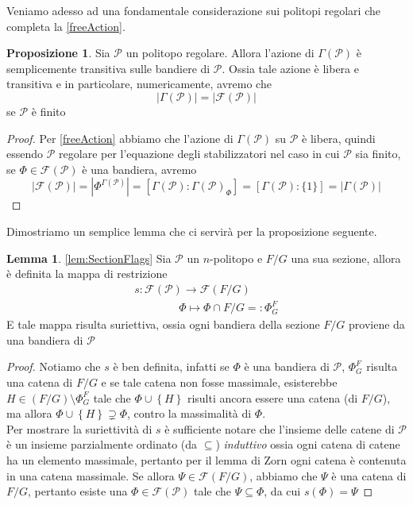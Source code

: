 \documentclass[a4paper,12pt]{report}
\newcommand{\p}{\mathcal{P}}
\theoremstyle{plain}
\theoremstyle{definition}
\newtheorem{lem}[teo]{Lemma}
\newtheorem{prop}[teo]{Proposizione}
\begin{document}
Veniamo adesso ad una fondamentale considerazione sui politopi regolari che completa la \ref{freeAction}.
\begin{prop}
Sia $\p$ un politopo regolare. Allora l'azione di $\Gamma(\p)$ \`e semplicemente transitiva sulle bandiere di $\p$. Ossia tale azione \`e 
libera e transitiva e in particolare, numericamente, avremo che
\begin{equation*}
\left|\Gamma(\p)\right|=\left|\mathcal{F}(\p)\right|
\end{equation*}
se $\p$ \`e finito
\end{prop}
\begin{proof}
Per \ref{freeAction} abbiamo che l'azione di $\Gamma(\p)$ su $\p$ \`e libera, quindi essendo $\p$ regolare per l'equazione degli stabilizzatori
nel caso in cui $\p$ sia finito, se $\Phi\in\mathcal{F}(\p)$ \`e una bandiera, avremo
\begin{equation*}
\left|\mathcal{F}(\p)\right|=\left|\Phi^{\Gamma(\p)}\right|=\left[\Gamma(\p):\Gamma(\p)_\Phi\right]=\left[\Gamma(\p):\{1\}\right]
=\left|\Gamma(\p)\right|
\end{equation*}
\end{proof}

Dimostriamo un semplice lemma che ci servir\`a per la proposizione seguente.

\begin{lem}
\ref{lem:SectionFlags}
Sia $\p$ un $n$-politopo e $F/G$ una sua sezione, allora \`e definita la mappa di restrizione
\begin{gather*}
s:\mathcal{F}(\p)\longrightarrow\mathcal{F}(F/G)\\
\qquad\qquad \Phi\longmapsto\Phi\cap F/G=:\Phi_G^F
\end{gather*}
E tale mappa risulta suriettiva, ossia ogni bandiera della sezione $F/G$ proviene da una bandiera di $\p$
\end{lem}
\begin{proof}
Notiamo che $s$ \`e ben definita, infatti se $\Phi$ \`e una bandiera di $\p$, $\Phi_G^F$ risulta una catena di $F/G$
e se tale catena non fosse massimale, esisterebbe $H\in (F/G)\setminus\Phi_G^F$ tale che $\Phi\cup\left\{H\right\}$ risulti ancora essere
una catena (di $F/G$), ma allora $\Phi\cup\left\{H\right\}\supsetneq\Phi$, contro la massimalit\`a di $\Phi$.\\
Per mostrare la suriettivit\`a di $s$ \`e sufficiente notare che l'insieme delle catene di $\p$ \`e un insieme 
parzialmente ordinato (da $\subseteq$) \emph{induttivo} ossia
ogni catena di catene ha un elemento massimale, pertanto per il lemma di Zorn ogni catena \`e contenuta in una catena massimale.
Se allora $\Psi\in\mathcal{F}(F/G)$, abbiamo che $\Psi$ \`e una catena di $F/G$, pertanto esiste una $\Phi\in\mathcal{F}(\p)$
tale che $\Psi\subseteq\Phi$, da cui $s(\Phi)=\Psi$
\end{proof}
\end{document}
